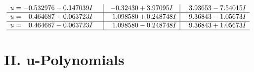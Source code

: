 \documentclass[1p]{elsarticle_modified}
\theoremstyle{definition}
\begin{document}
$$\begin{array}{c|c|c}
\begin{aligned}
u &= -0.532976 - 0.147039 I\end{aligned}
 & -0.32430 + 3.97095 I & \phantom{-}3.93653 - 7.54015 I \\ \hline\begin{aligned}
u &= \phantom{-}0.464687 + 0.063723 I\end{aligned}
 & \phantom{-}1.098580 + 0.248748 I & \phantom{-}9.36843 - 1.05673 I \\ \hline\begin{aligned}
u &= \phantom{-}0.464687 - 0.063723 I\end{aligned}
 & \phantom{-}1.098580 - 0.248748 I & \phantom{-}9.36843 + 1.05673 I\\
 \hline 
 \end{array}$$\newpage
\newpage\renewcommand{\arraystretch}{1}
\centering \section*{ II. u-Polynomials}
\end{document}
